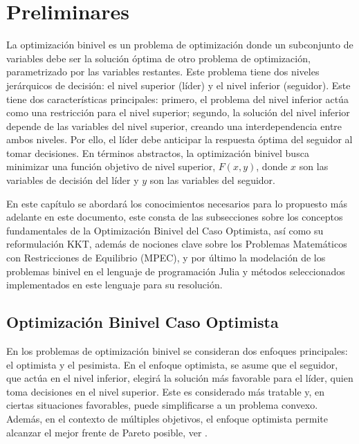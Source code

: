 \chapter{Preliminares}

La optimización binivel es un problema de optimización donde un subconjunto de variables debe ser la solución óptima de otro problema de optimización, parametrizado por las variables restantes. Este problema tiene dos niveles jerárquicos de decisión: el nivel superior (líder) y el nivel inferior (seguidor).
Este tiene dos características principales: primero, el problema del nivel inferior actúa como una restricción para el nivel superior; segundo, la solución del nivel inferior depende de las variables del nivel superior, creando una interdependencia entre ambos niveles. Por ello, el líder debe anticipar la respuesta óptima del seguidor al tomar decisiones.
En términos abstractos, la optimización binivel busca minimizar una función objetivo de nivel superior, $F(x, y)$, donde $x$ son las variables de decisión del líder y $y$ son las variables del seguidor. 

En este capítulo se abordará los conocimientos necesarios para lo propuesto más adelante en este documento, este consta de las subsecciones sobre los conceptos fundamentales de la Optimización Binivel del Caso Optimista, así como su reformulación KKT,
además de nociones clave sobre los Problemas Matemáticos con Restricciones de Equilibrio (MPEC), 
y por último la modelación de los problemas binivel en el lenguaje de programación Julia y métodos seleccionados implementados en este lenguaje para su resolución. 

\section{Optimización Binivel Caso Optimista}


En los problemas de optimización binivel se consideran dos enfoques principales: el optimista y el pesimista. En el enfoque optimista, se asume que el seguidor, que actúa en el nivel inferior, elegirá la solución más favorable para el líder, quien toma decisiones en el nivel superior. Este es considerado más tratable y, en ciertas situaciones favorables, puede simplificarse a un problema convexo. Además, en el contexto de múltiples objetivos, el enfoque optimista permite alcanzar el mejor frente de Pareto posible, ver \cite{DempeyZemkoho2020}.

